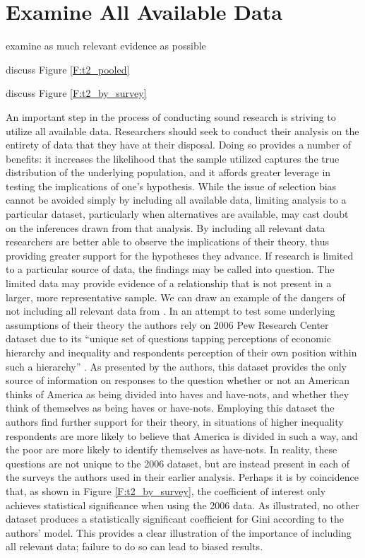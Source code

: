 
\section{Examine All Available Data}

examine as much relevant evidence as possible

discuss Figure \ref{F:t2_pooled}

discuss Figure \ref{F:t2_by_survey}

An important step in the process of conducting sound research is striving to utilize all available data. Researchers should seek to conduct their analysis on the entirety of data that they have at their disposal. Doing so provides a number of benefits:  it increases the likelihood that the sample utilized captures the true distribution of the underlying population, and it affords greater leverage in testing the implications of one’s hypothesis. While the issue of selection bias cannot be avoided simply by including all available data, limiting analysis to a particular dataset, particularly when alternatives are available, may cast doubt on the inferences drawn from that analysis. By including all relevant data researchers are better able to observe the implications of their theory, thus providing greater support for the hypotheses they advance.
If research is limited to a particular source of data, the findings may be called into question. The limited data may provide evidence of a relationship that is not present in a larger, more representative sample. We can draw an example of the dangers of not including all relevant data from \citet{Newman2015}.  In an attempt to test some underlying assumptions of their theory the authors rely on 2006 Pew Research Center dataset due to its “unique set of questions tapping perceptions of economic hierarchy and inequality and respondents perception of their own position within such a hierarchy” \citep{Newman2015 p.336}. As presented by the authors, this dataset provides the only source of information on responses to the question whether or not an American thinks of America as being divided into haves and have-nots, and whether they think of themselves as being haves or have-nots. Employing this dataset the authors find further support for their theory, in situations of higher inequality respondents are more likely to believe that America is divided in such a way, and the poor are more likely to identify themselves as have-nots. In reality, these questions are not unique to the 2006 dataset, but are instead present in each of the surveys the authors used in their earlier analysis. Perhaps it is by coincidence that, as shown in Figure \ref{F:t2_by_survey}, the coefficient of interest only achieves statistical significance when using the 2006 data. As illustrated, no other dataset produces a statistically significant coefficient for Gini according to the authors’ model. This provides a clear illustration of the importance of including all relevant data; failure to do so can lead to biased results.
